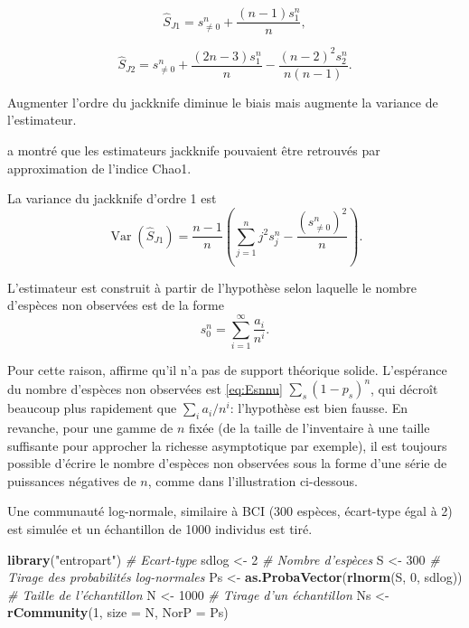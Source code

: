 \documentclass[
  11pt,
  french,
  a4paper,
  extrafontsizes,onecolumn,openright
  ]{memoir}
\newenvironment{Shaded}{\begin{snugshade}}{\end{snugshade}}
\newcommand{\CommentTok}[1]{\textcolor[rgb]{0.56,0.35,0.01}{\textit{#1}}}
\newcommand{\DataTypeTok}[1]{\textcolor[rgb]{0.13,0.29,0.53}{#1}}
\newcommand{\DecValTok}[1]{\textcolor[rgb]{0.00,0.00,0.81}{#1}}
\newcommand{\KeywordTok}[1]{\textcolor[rgb]{0.13,0.29,0.53}{\textbf{#1}}}
\newcommand{\NormalTok}[1]{#1}
\newcommand{\StringTok}[1]{\textcolor[rgb]{0.31,0.60,0.02}{#1}}
\begin{document}
\begin{equation}
  \label{eq:Jack1}
  \hat{S}_\mathit{J1} = {s^{n}_{\ne 0}} + \frac{\left(n-1\right){s^{n}_{1}}}{n},
\end{equation}

\begin{equation} 
  \label{eq:Jack2}
  \hat{S}_\mathit{J2} = {s^{n}_{\ne 0}} + \frac{\left(2n-3\right){s^{n}_{1}}}{n} - \frac{{\left(n-2\right)}^{2}s^{n}_{2}}{n\left(n-1\right)}.
\end{equation}

Augmenter l'ordre du jackknife diminue le biais mais augmente la variance de l'estimateur.

\textcite{Chao1984} a montré que les estimateurs jackknife pouvaient être retrouvés par approximation de l'indice Chao1.

La variance du jackknife d'ordre 1 est \autocite{Heltshe1983}
\begin{equation} 
  \label{eq:VarJack1}
  \operatorname{Var}{\left( \hat{S}_\mathit{J1} \right)}
  = \frac{n-1}{n} \left( \sum_{j=1}^{n}{j^2 s^{n}_{j}} - \frac{\left( s^{n}_{\ne 0} \right)^2}{n} \right).
\end{equation}

L'estimateur est construit à partir de l'hypothèse selon laquelle le nombre d'espèces non observées est de la forme
\[s^{n}_{0} = \sum_{i=1}^{\infty}{\frac{a_i}{n^i}}.\]

Pour cette raison, \textcite{Cormack1989} affirme qu'il n'a pas de support théorique solide.
L'espérance du nombre d'espèces non observées est \eqref{eq:Esnnu} \(\sum_s{(1-p_s)^n}\), qui décroît beaucoup plus rapidement que \(\sum_{i}{{a_i}/{n^i}}\): l'hypothèse est bien fausse.
En revanche, pour une gamme de \(n\) fixée (de la taille de l'inventaire à une taille suffisante pour approcher la richesse asymptotique par exemple), il est toujours possible d'écrire le nombre d'espèces non observées sous la forme d'une série de puissances négatives de \(n\), comme dans l'illustration ci-dessous.

Une communauté log-normale, similaire à BCI (300 espèces, écart-type égal à 2) est simulée et un échantillon de 1000 individus est tiré.

\scriptsize

\begin{Shaded}
\begin{Highlighting}[]
\KeywordTok{library}\NormalTok{(}\StringTok{"entropart"}\NormalTok{)}
\CommentTok{# Ecart-type}
\NormalTok{sdlog <-}\StringTok{ }\DecValTok{2}
\CommentTok{# Nombre d'espèces}
\NormalTok{S <-}\StringTok{ }\DecValTok{300}
\CommentTok{# Tirage des probabilités log-normales}
\NormalTok{Ps <-}\StringTok{ }\KeywordTok{as.ProbaVector}\NormalTok{(}\KeywordTok{rlnorm}\NormalTok{(S, }\DecValTok{0}\NormalTok{, sdlog))}
\CommentTok{# Taille de l'échantillon}
\NormalTok{N <-}\StringTok{ }\DecValTok{1000}
\CommentTok{# Tirage d'un échantillon}
\NormalTok{Ns <-}\StringTok{ }\KeywordTok{rCommunity}\NormalTok{(}\DecValTok{1}\NormalTok{, }\DataTypeTok{size =}\NormalTok{ N, }\DataTypeTok{NorP =}\NormalTok{ Ps)}
\end{Highlighting}
\end{Shaded}
\end{document}
